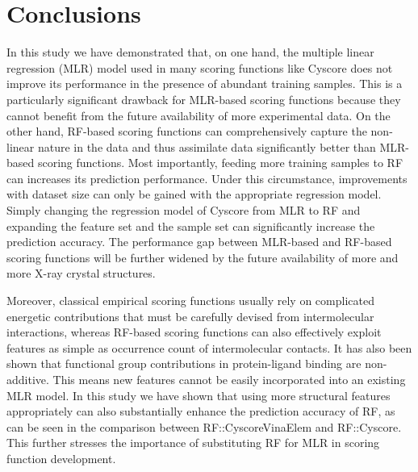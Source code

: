 \section{Conclusions}

In this study we have demonstrated that, on one hand, the multiple linear regression (MLR) model used in many scoring functions like Cyscore does not improve its performance in the presence of abundant training samples. This is a particularly significant drawback for MLR-based scoring functions because they cannot benefit from the future availability of more experimental data. On the other hand, RF-based scoring functions can comprehensively capture the non-linear nature in the data and thus assimilate data significantly better than MLR-based scoring functions. Most importantly, feeding more training samples to RF can increases its prediction performance. Under this circumstance, improvements with dataset size can only be gained with the appropriate regression model. Simply changing the regression model of Cyscore from MLR to RF and expanding the feature set and the sample set can significantly increase the prediction accuracy. The performance gap between MLR-based and RF-based scoring functions will be further widened by the future availability of more and more X-ray crystal structures.

Moreover, classical empirical scoring functions usually rely on complicated energetic contributions that must be carefully devised from intermolecular interactions, whereas RF-based scoring functions can also effectively exploit features as simple as occurrence count of intermolecular contacts. It has also been shown that functional group contributions in protein-ligand binding are non-additive. This means new features cannot be easily incorporated into an existing MLR model. In this study we have shown that using more structural features appropriately can also substantially enhance the prediction accuracy of RF, as can be seen in the comparison between RF::CyscoreVinaElem and RF::Cyscore. This further stresses the importance of substituting RF for MLR in scoring function development.

\chapterend
